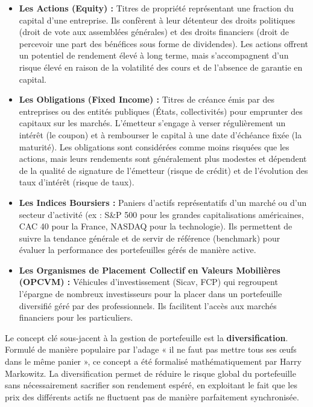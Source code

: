 \begin{itemize}
    \item \textbf{Les Actions (Equity) :} Titres de propriété représentant une fraction du capital d'une entreprise. Ils confèrent à leur détenteur des droits politiques (droit de vote aux assemblées générales) et des droits financiers (droit de percevoir une part des bénéfices sous forme de dividendes). Les actions offrent un potentiel de rendement élevé à long terme, mais s'accompagnent d'un risque élevé en raison de la volatilité des cours et de l'absence de garantie en capital.
    \item \textbf{Les Obligations (Fixed Income) :} Titres de créance émis par des entreprises ou des entités publiques (États, collectivités) pour emprunter des capitaux sur les marchés. L'émetteur s'engage à verser régulièrement un intérêt (le coupon) et à rembourser le capital à une date d'échéance fixée (la maturité). Les obligations sont considérées comme moins risquées que les actions, mais leurs rendements sont généralement plus modestes et dépendent de la qualité de signature de l'émetteur (risque de crédit) et de l'évolution des taux d'intérêt (risque de taux).
    \item \textbf{Les Indices Boursiers :} Paniers d'actifs représentatifs d'un marché ou d'un secteur d'activité (ex : S\&P 500 pour les grandes capitalisations américaines, CAC 40 pour la France, NASDAQ pour la technologie). Ils permettent de suivre la tendance générale et de servir de référence (benchmark) pour évaluer la performance des portefeuilles gérés de manière active.
    \item \textbf{Les Organismes de Placement Collectif en Valeurs Mobilières (OPCVM) :} Véhicules d'investissement (Sicav, FCP) qui regroupent l'épargne de nombreux investisseurs pour la placer dans un portefeuille diversifié géré par des professionnels. Ils facilitent l'accès aux marchés financiers pour les particuliers.
\end{itemize}

Le concept clé sous-jacent à la gestion de portefeuille est la \textbf{diversification}. Formulé de manière populaire par l'adage « il ne faut pas mettre tous ses œufs dans le même panier », ce concept a été formalisé mathématiquement par Harry Markowitz. La diversification permet de réduire le risque global du portefeuille sans nécessairement sacrifier son rendement espéré, en exploitant le fait que les prix des différents actifs ne fluctuent pas de manière parfaitement synchronisée.

